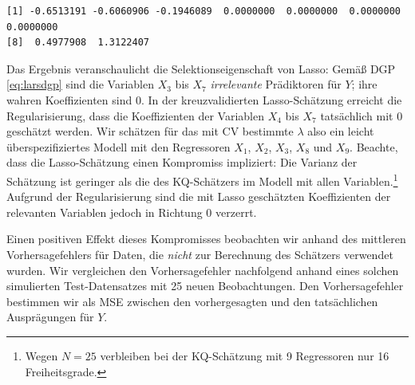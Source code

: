 \documentclass[
  a4paper,
  DIV=11,
  oneside]{scrreprt}
\newenvironment{Shaded}{\begin{snugshade}}{\end{snugshade}}
\newcommand{\AttributeTok}[1]{\textcolor[rgb]{0.40,0.45,0.13}{#1}}
\newcommand{\CommentTok}[1]{\textcolor[rgb]{0.37,0.37,0.37}{#1}}
\newcommand{\DecValTok}[1]{\textcolor[rgb]{0.68,0.00,0.00}{#1}}
\newcommand{\FunctionTok}[1]{\textcolor[rgb]{0.28,0.35,0.67}{#1}}
\newcommand{\NormalTok}[1]{\textcolor[rgb]{0.00,0.23,0.31}{#1}}
\newcommand{\OtherTok}[1]{\textcolor[rgb]{0.00,0.23,0.31}{#1}}
\newcommand{\SpecialCharTok}[1]{\textcolor[rgb]{0.37,0.37,0.37}{#1}}
\newcommand{\StringTok}[1]{\textcolor[rgb]{0.13,0.47,0.30}{#1}}
\begin{document}
\begin{verbatim}
[1] -0.6513191 -0.6060906 -0.1946089  0.0000000  0.0000000  0.0000000  0.0000000
[8]  0.4977908  1.3122407
\end{verbatim}

Das Ergebnis veranschaulicht die Selektionseigenschaft von Lasso: Gemäß
DGP \eqref{eq:larsdgp} sind die Variablen \(X_3\) bis \(X_7\)
\emph{irrelevante} Prädiktoren für \(Y\); ihre wahren Koeffizienten sind
\(0\). In der kreuzvalidierten Lasso-Schätzung erreicht die
Regularisierung, dass die Koeffizienten der Variablen \(X_4\) bis
\(X_7\) tatsächlich mit 0 geschätzt werden. Wir schätzen für das mit CV
bestimmte \(\lambda\) also ein leicht überspezifiziertes Modell mit den
Regressoren \(X_1\), \(X_2\), \(X_3\), \(X_8\) und \(X_9\). Beachte,
dass die Lasso-Schätzung einen Kompromiss impliziert: Die Varianz der
Schätzung ist geringer als die des KQ-Schätzers im Modell mit allen
Variablen.\footnote{Wegen \(N=25\) verbleiben bei der KQ-Schätzung mit 9
  Regressoren nur 16 Freiheitsgrade.} Aufgrund der Regularisierung sind
die mit Lasso geschätzten Koeffizienten der relevanten Variablen jedoch
in Richtung \(0\) verzerrt.

Einen positiven Effekt dieses Kompromisses beobachten wir anhand des
mittleren Vorhersagefehlers für Daten, die \emph{nicht} zur Berechnung
des Schätzers verwendet wurden. Wir vergleichen den Vorhersagefehler
nachfolgend anhand eines solchen simulierten Test-Datensatzes mit 25
neuen Beobachtungen. Den Vorhersagefehler bestimmen wir als MSE zwischen
den vorhergesagten und den tatsächlichen Ausprägungen für \(Y\).

\begin{Shaded}
\end{Shaded}
\end{document}
